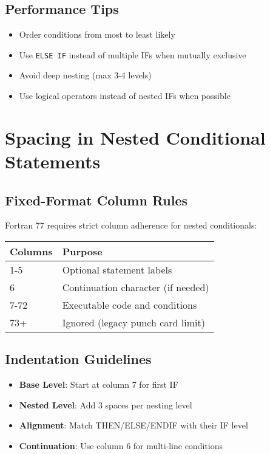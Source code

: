 \documentclass{book}
\begin{document}
\subsection*{Performance Tips}
\begin{itemize}
    \item Order conditions from most to least likely
    \item Use \texttt{ELSE IF} instead of multiple IFs when mutually exclusive
    \item Avoid deep nesting (max 3-4 levels)
    \item Use logical operators instead of nested IFs when possible
\end{itemize}

\section{Spacing in Nested Conditional Statements}

\subsection*{Fixed-Format Column Rules}
Fortran 77 requires strict column adherence for nested conditionals:
\begin{center}
\begin{tabular}{|l|l|}
\hline
\textbf{Columns} & \textbf{Purpose} \\ 
\hline
1-5 & Optional statement labels \\
6 & Continuation character (if needed) \\
7-72 & Executable code and conditions \\
73+ & Ignored (legacy punch card limit) \\
\hline
\end{tabular}
\end{center}

\subsection*{Indentation Guidelines}
\begin{itemize}
    \item \textbf{Base Level}: Start at column 7 for first IF
    \item \textbf{Nested Level}: Add 3 spaces per nesting level
    \item \textbf{Alignment}: Match THEN/ELSE/ENDIF with their IF level
    \item \textbf{Continuation}: Use column 6 for multi-line conditions
\end{itemize}
\end{document}
